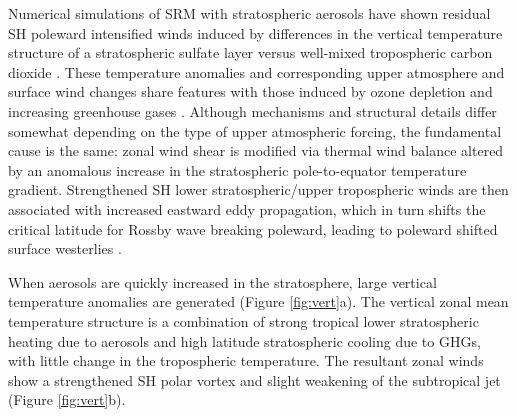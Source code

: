 \documentclass{nature}
\begin{document}

Numerical simulations of SRM with stratospheric aerosols have shown residual SH poleward intensified winds induced by differences in the vertical temperature structure of a stratospheric sulfate layer versus well-mixed tropospheric carbon dioxide \cite{ammann10,mccusker12}. These temperature anomalies and corresponding upper atmosphere and surface wind changes share features with those induced by ozone depletion \cite{gillett03,gillett13,sigmond11,thompson11} and increasing greenhouse gases \cite{gillett13,sigmond11,polvani11}. Although mechanisms and structural details differ somewhat depending on the type of upper atmospheric forcing, the fundamental cause is the same: zonal wind shear is modified via thermal wind balance altered by an anomalous increase in the stratospheric pole-to-equator temperature gradient. Strengthened SH lower stratospheric/upper tropospheric winds are then associated with increased eastward eddy propagation, which in turn shifts the critical latitude for Rossby wave breaking poleward, leading to poleward shifted surface westerlies \cite{chen07}.%

When aerosols are quickly increased in the stratosphere, large vertical temperature anomalies are generated (Figure \ref{fig:vert}a). The vertical zonal mean temperature structure is a combination of strong tropical lower stratospheric heating due to aerosols \cite{ferraro11} and high latitude stratospheric cooling due to GHGs, with little change in the tropospheric temperature. The resultant zonal winds show a strengthened SH polar vortex and slight weakening of the subtropical jet (Figure \ref{fig:vert}b). %
\end{document}
